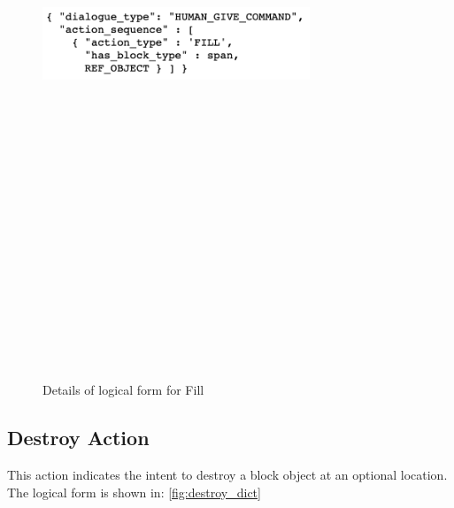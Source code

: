 \begin{figure}[h]
    \centering
    \includegraphics[width=8cm,height=20cm,keepaspectratio]{figures/fill.png}
    \caption{Details of logical form  for Fill}
    \label{fig:fill_dict}
\end{figure}

\subsection{ Destroy Action}
This action indicates the intent to destroy a block object at an optional location. The logical form  is shown in: \ref{fig:destroy_dict}

